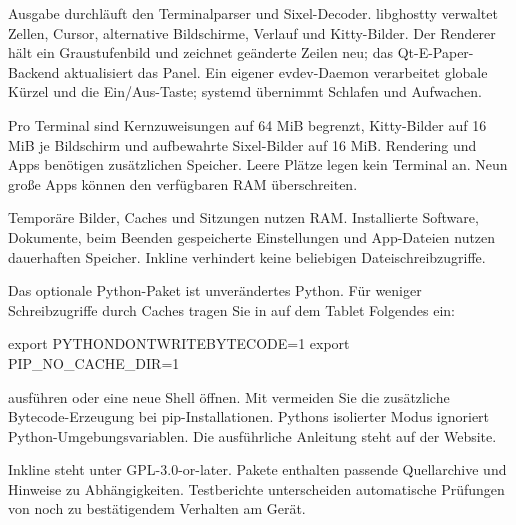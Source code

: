 Ausgabe durchläuft den Terminalparser und Sixel-Decoder. libghostty verwaltet
Zellen, Cursor, alternative Bildschirme, Verlauf und Kitty-Bilder. Der Renderer
hält ein Graustufenbild und zeichnet geänderte Zeilen neu; das Qt-E-Paper-Backend
aktualisiert das Panel. Ein eigener evdev-Daemon verarbeitet globale Kürzel
und die Ein/Aus-Taste; systemd übernimmt Schlafen und Aufwachen.

Pro Terminal sind Kernzuweisungen auf 64 MiB begrenzt, Kitty-Bilder auf
16 MiB je Bildschirm und aufbewahrte Sixel-Bilder auf 16 MiB. Rendering und
Apps benötigen zusätzlichen Speicher. Leere Plätze legen kein Terminal an.
Neun große Apps können den verfügbaren RAM überschreiten.

Temporäre Bilder, Caches und Sitzungen nutzen RAM. Installierte Software,
Dokumente, beim Beenden gespeicherte Einstellungen und App-Dateien nutzen
dauerhaften Speicher. Inkline verhindert keine beliebigen Dateischreibzugriffe.

Das optionale Python-Paket ist unverändertes Python. Für weniger Schreibzugriffe
durch Caches tragen Sie in  auf dem Tablet Folgendes ein:
\begin{shell}
export PYTHONDONTWRITEBYTECODE=1
export PIP_NO_CACHE_DIR=1
\end{shell}
 ausführen oder eine neue Shell öffnen. Mit
 vermeiden Sie die zusätzliche
Bytecode-Erzeugung bei pip-Installationen. Pythons isolierter Modus ignoriert
Python-Umgebungsvariablen. Die ausführliche Anleitung steht auf der Website.

Inkline steht unter GPL-3.0-or-later. Pakete enthalten passende Quellarchive
und Hinweise zu Abhängigkeiten. Testberichte unterscheiden automatische
Prüfungen von noch zu bestätigendem Verhalten am Gerät.
